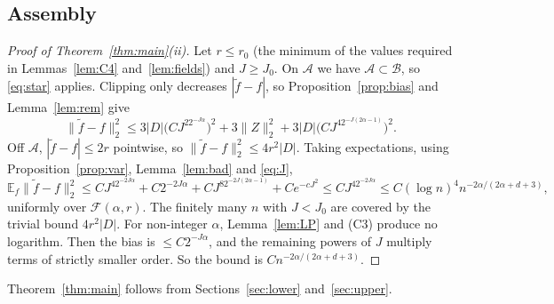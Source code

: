 \documentclass[11pt]{article}
\theoremstyle{definition}
\theoremstyle{remark}
\newcommand{\E}{\mathbb E}
\newcommand{\Fc}{\mathcal F}
\newcommand{\rate}{n^{-2\alpha/(2\alpha+d+3)}}
\newcommand{\cA}{\mathcal A}
\newcommand{\cB}{\mathcal B}
\begin{document}
\subsection{Assembly}

\begin{proof}[Proof of Theorem~\ref{thm:main}(ii)]
Let $r\le r_0$ (the minimum of the values required in Lemmas~\ref{lem:C4} and~\ref{lem:fields}) and $J\ge J_0$. On $\cA$ we have $\cA\subset\cB$, so \eqref{eq:star} applies. Clipping only decreases $|\tilde f-f|$, so Proposition~\ref{prop:bias} and Lemma~\ref{lem:rem} give
\[
\|\tilde f-f\|_2^2\le3|D|\big(CJ^22^{-J\alpha}\big)^2+3\|Z\|_2^2+3|D|\big(CJ^42^{-J(2\alpha-1)}\big)^2 .
\]
Off $\cA$, $|\tilde f-f|\le2r$ pointwise, so $\|\tilde f-f\|_2^2\le4r^2|D|$. Taking expectations, using Proposition~\ref{prop:var}, Lemma~\ref{lem:bad} and \eqref{eq:J},
\[
\E_f\|\tilde f-f\|_2^2\le CJ^42^{-2J\alpha}+C2^{-2J\alpha}+CJ^82^{-2J(2\alpha-1)}+Ce^{-cJ^2}\le CJ^42^{-2J\alpha}\le C(\log n)^4\rate,
\]
uniformly over $\Fc(\alpha,r)$. The finitely many $n$ with $J<J_0$ are covered by the trivial bound $4r^2|D|$. For non-integer $\alpha$, Lemma~\ref{lem:LP} and (C3) produce no logarithm. Then the bias is $\le C2^{-J\alpha}$, and the remaining powers of $J$ multiply terms of strictly smaller order. So the bound is $C\rate$.
\end{proof}

Theorem~\ref{thm:main} follows from Sections~\ref{sec:lower} and~\ref{sec:upper}.
\end{document}
